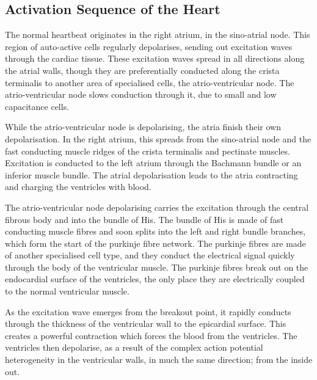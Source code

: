 \subsection{Activation Sequence of the Heart}

The normal heartbeat originates in the right atrium, in the sino-atrial node.
This region of auto-active cells regularly depolarises, sending out excitation
waves through the cardiac tissue.
These excitation waves spread in all directions along the atrial walls, though
they are preferentially conducted along the crista terminalis to another area of
specialised cells, the atrio-ventricular node.
The atrio-ventricular node slows conduction through it, due to small and low
capacitance cells.

While the atrio-ventricular node is depolarising, the atria finish their own
depolarisation.
In the right atrium, this spreads from the sino-atrial node and the fast
conducting muscle ridges of the crista terminalis and pectinate muscles.
Excitation is conducted to the left atrium through the Bachmann bundle or
an inferior muscle bundle.
The atrial depolarisation leads to the atria contracting and charging the
ventricles with blood.

The atrio-ventricular node depolarising carries the excitation through the
central fibrous body and into the bundle of His.
The bundle of His is made of fast conducting muscle fibres and soon splits into
the left and right bundle branches, which form the start of the purkinje fibre
network.
The purkinje fibres are made of another specialised cell type, and they conduct
the electrical signal quickly through the body of the ventricular muscle.
The purkinje fibres break out on the endocardial surface of the ventricles, the
only place they are electrically coupled to the normal ventricular muscle.

As the excitation wave emerges from the breakout point, it rapidly conducts
through the thickness of the ventricular wall to the epicardial surface.
This creates a powerful contraction which forces the blood from the ventricles.
The ventricles then depolarise, as a result of the complex action potential
heterogeneity in the ventricular walls, in much the same direction; from the
inside out.
